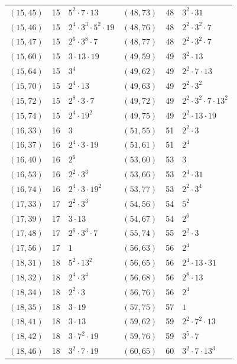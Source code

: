 \documentclass[11pt]{article}
\begin{document}
\begin{longtable}{@{}lrl@{\qquad}lrl@{}}
$(15,45)$ & 15 & $5^{2}\cdot 7\cdot 13$ & $(48,73)$ & 48 & $3^{2}\cdot 31$\\
$(15,46)$ & 15 & $2^{4}\cdot 3^{3}\cdot 5^{2}\cdot 19$ & $(48,76)$ & 48 & $2^{2}\cdot 3^{2}\cdot 7$\\
$(15,47)$ & 15 & $2^{6}\cdot 3^{8}\cdot 7$ & $(48,77)$ & 48 & $2^{2}\cdot 3^{2}\cdot 7$\\
$(15,60)$ & 15 & $3\cdot 13\cdot 19$ & $(49,59)$ & 49 & $3^{2}\cdot 13$\\
$(15,64)$ & 15 & $3^{4}$ & $(49,62)$ & 49 & $2^{2}\cdot 7\cdot 13$\\
$(15,70)$ & 15 & $2^{4}\cdot 13$ & $(49,63)$ & 49 & $2^{2}\cdot 3^{2}$\\
$(15,72)$ & 15 & $2^{8}\cdot 3\cdot 7$ & $(49,72)$ & 49 & $2^{2}\cdot 3^{2}\cdot 7\cdot 13^{2}$\\
$(15,74)$ & 15 & $2^{4}\cdot 19^{2}$ & $(49,75)$ & 49 & $2^{2}\cdot 13\cdot 19$\\
$(16,33)$ & 16 & $3$ & $(51,55)$ & 51 & $2^{2}\cdot 3$\\
$(16,37)$ & 16 & $2^{4}\cdot 3\cdot 19$ & $(51,61)$ & 51 & $2^{4}$\\
$(16,40)$ & 16 & $2^{6}$ & $(53,60)$ & 53 & $3$\\
$(16,53)$ & 16 & $2^{2}\cdot 3^{3}$ & $(53,66)$ & 53 & $2^{4}\cdot 31$\\
$(16,74)$ & 16 & $2^{4}\cdot 3\cdot 19^{2}$ & $(53,77)$ & 53 & $2^{2}\cdot 3^{4}$\\
$(17,33)$ & 17 & $2^{2}\cdot 3^{3}$ & $(54,56)$ & 54 & $5^{2}$\\
$(17,39)$ & 17 & $3\cdot 13$ & $(54,67)$ & 54 & $2^{6}$\\
$(17,48)$ & 17 & $2^{6}\cdot 3^{3}\cdot 7$ & $(55,74)$ & 55 & $2^{2}\cdot 3$\\
$(17,56)$ & 17 & $1$ & $(56,63)$ & 56 & $2^{4}$\\
$(18,31)$ & 18 & $5^{2}\cdot 13^{2}$ & $(56,65)$ & 56 & $2^{4}\cdot 13\cdot 31$\\
$(18,32)$ & 18 & $2^{4}\cdot 3^{4}$ & $(56,68)$ & 56 & $2^{8}\cdot 13$\\
$(18,34)$ & 18 & $2^{2}\cdot 3$ & $(56,76)$ & 56 & $2^{4}$\\
$(18,35)$ & 18 & $3\cdot 19$ & $(57,75)$ & 57 & $1$\\
$(18,41)$ & 18 & $3\cdot 13$ & $(59,62)$ & 59 & $2^{2}\cdot 7^{2}\cdot 13$\\
$(18,42)$ & 18 & $3\cdot 7^{2}\cdot 19$ & $(59,76)$ & 59 & $3^{5}\cdot 7$\\
$(18,46)$ & 18 & $3^{2}\cdot 7\cdot 19$ & $(60,65)$ & 60 & $3^{2}\cdot 7\cdot 13^{3}$\\

\end{longtable}
\end{document}
